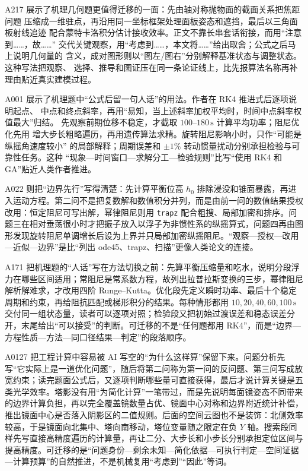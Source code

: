 \documentclass[UTF8,a4paper,12pt]{ctexart}
\begin{document}
A217 展示了机理几何题更值得迁移的一面：先由轴对称抛物面的截面关系把焦距问题
压缩成一维驻点，再沿用同一坐标框架处理面板姿态和遮挡，最后以三角面板射线追迹
配合蒙特卡洛积分估计接收效率。正文不靠长串套话衔接，而用“注意到……，故……”
交代关键观察，用“考虑到……，本文将……”给出取舍；公式之后马上说明几何量的
含义，成对图形则以“图左/图右”分别解释基准状态与调整状态。这种写法把观察、
选择、推导和图证压在同一条论证线上，比先报算法名称再补理由贴近真实建模过程。

A001 展示了机理题中“公式后留一句人话”的用法。作者在 RK4 推进式后逐项说明起点、
中点和终点斜率，再用“易知，当上述斜率加权平均时，时间中点斜率权值最大”归结。
先观察前期位移不稳定，才截取 $100$--$180\,\mathrm{s}$ 计算平均功率；阻尼优化先用
增大步长粗略遍历，再用遗传算法求精。旋转阻尼影响小时，只作“可能是纵摇角速度较小”
的局部解释；周期误差和 $\pm1\%$ 转动惯量扰动分别承担检验与可靠性任务。这种
“现象—时间窗口—求解分工—检验规则”比写“使用 RK4 和 GA”贴近人类作者推进。

A022 则把“边界先行”写得清楚：先计算平衡位高 $h_0$ 排除浸没和锥面暴露，再进入运动方程。第二问不是把复数解和数值积分并列，而是由前一问的数值结果授权改用：恒定阻尼可写出解，幂律阻尼则用 \texttt{trapz} 配合粗搜、局部加密和排序。问题三在相对垂荡很小时才把振子放入以浮子为非惯性系的纵摇算式，问题四再由图形发现旋转阻尼单调增长后设为上界并只局部加密纵摇阻尼。“观察—授权—改用—近似—边界”是比“列出 ode45、trapz、扫描”更像人类论文的连接。

A171 把机理题的“人话”写在方法切换之前：先算平衡压缩量和吃水，说明分段浮力在哪些区间适用；常阻尼是常系数方程，故列出拉普拉斯变换的三步，幂律阻尼解析解难求，才改用四阶 Runge--Kutta。优化段先定义瞬时功率、最后十个稳定周期和约束，再给阻抗匹配或梯形积分的结果。每种情形都用 $10,20,40,60,100\,\mathrm{s}$ 交付同一组状态量，读者可以逐项对照；检验段又把初始过渡误差和稳态误差分开，末尾给出“可以接受”的判断。可迁移的不是“任何题都用 RK4”，而是“边界—方程性质—方法—同口径结果—判定”的段落顺序。

A0127 把工程计算中容易被 AI 写空的“为什么这样算”保留下来。问题分析先写“它实际上是一道优化问题”，随后将第二问称为第一问的反问题、第三问写成放宽约束；读完题面公式后，又逐项判断哪些量可直接获得，最后才说计算关键是五类光学效率。塔影没有用“为简化计算”一笔带过，而是先说明每面镜姿态不同带来的边界计算负担，再以完全覆盖镜数量占优、镜面中心对称和边界附近统计补偿，推出镜面中心是否落入阴影区的二值规则。后面的空间云图也不是装饰：北侧效率较高，于是镜面向北集中、塔向南移动，塔位变量随之限定在负 $Y$ 轴。搜索段同样先写直接高精度遍历的计算量，再让二分、大步长和小步长分别承担定位区间与提高精度。可迁移的是“问题身份—剩余未知—简化依据—可执行判定—空间证据—计算预算”的自然推进，不是机械复用“考虑到”“因此”等词。
\end{document}
